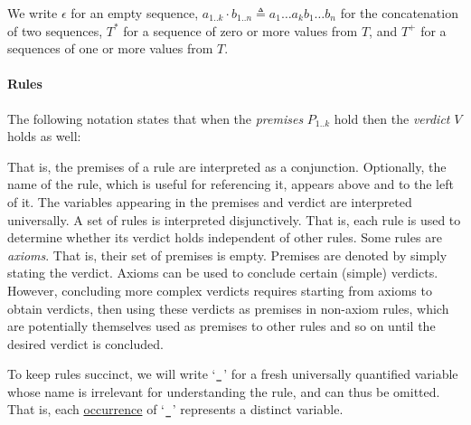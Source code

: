 We write $\epsilon$ for an empty sequence,
$a_{1..k} \cdot b_{1..n} \triangleq a_1\ldots a_k b_1 \ldots b_n$ for the concatenation of two sequences,
$T^*$ for a sequence of zero or more values from $T$, and $T^+$ for a sequences of one or more values from $T$.

\paragraph{Rules}
The following notation states that when the \emph{premises} $P_{1..k}$ hold then the \emph{verdict} $V$ holds as well:
\begin{mathpar}
\end{mathpar}
That is, the premises of a rule are interpreted as a conjunction.
%
Optionally, the name of the rule, which is useful for referencing it, appears above and to the left of it.
%
The variables appearing in the premises and verdict are interpreted universally.
%
A set of rules is interpreted disjunctively. That is, each rule is used to determine whether its verdict
holds independent of other rules.
%
Some rules are \emph{axioms}. That is, their set of premises is empty. Premises are denoted by simply
stating the verdict.
%
Axioms can be used to conclude certain (simple) verdicts.
However, concluding more complex verdicts requires
starting from axioms to obtain verdicts, then using these verdicts as premises in non-axiom rules,
which are potentially themselves used as premises to other rules and so on until the desired verdict
is concluded.

To keep rules succinct, we will write `$\Ignore$' for a fresh universally quantified variable whose name is
irrelevant for understanding the rule, and can thus be omitted. That is, each \underline{occurrence}
of `$\Ignore$' represents a distinct variable.

